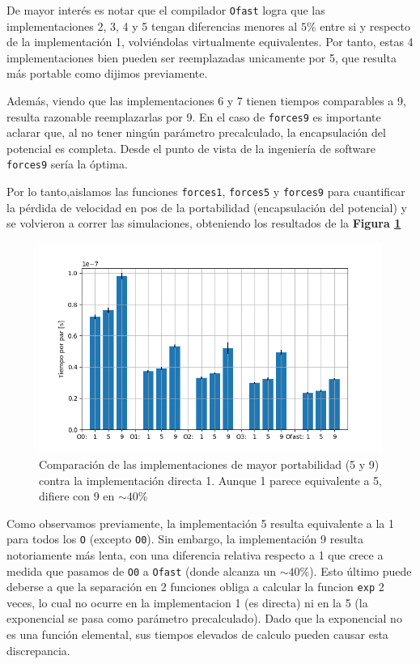 \documentclass[twoside, 12pt]{article}
\begin{document}
De mayor inter\'es es notar que el compilador \texttt{Ofast} logra que las implementaciones 2, 3, 4 y 5 tengan diferencias menores al $5\%$ entre si y respecto de la implementaci\'on 1, volvi\'endolas virtualmente equivalentes.  Por tanto, estas 4 implementaciones bien pueden ser reemplazadas unicamente por 5, que resulta m\'as portable como dijimos previamente.

Adem\'as, viendo que las implementaciones 6 y 7 tienen tiempos comparables a 9, resulta razonable reemplazarlas por 9. En el caso de \texttt{forces9} es importante aclarar que, al no tener ningún parámetro precalculado, la encapsulación del potencial es completa. Desde el punto de vista de la ingeniería de software \texttt{forces9} sería la óptima. 

Por lo tanto,aislamos las funciones \texttt{forces1}, \texttt{forces5} y \texttt{forces9} para cuantificar la pérdida de velocidad en pos de la portabilidad (encapsulación del potencial) y se volvieron a correr las simulaciones, obteniendo los resultados de la \textbf{Figura \ref{fig:CompEsp}}

\begin{figure}[h]
	\centering
	\includegraphics[trim = 10mm 5mm 10mm 5mm, clip, width=0.6\columnwidth]{Comp_tiempos_morse.png}
	\caption{Comparaci\'on de las implementaciones de mayor portabilidad (5 y 9) contra la implementaci\'on directa 1. Aunque 1 parece equivalente a 5, difiere con 9 en $\sim 40\%$}
	\label{fig:CompEsp}
\end{figure}

Como observamos previamente, la implementaci\'on 5 resulta equivalente a la 1 para todos los \texttt{O} (excepto \texttt{O0}). Sin embargo, la implementaci\'on 9 resulta notoriamente m\'as lenta, con una diferencia relativa respecto a 1 que crece a medida que pasamos de \texttt{O0} a \texttt{Ofast} (donde alcanza un $\sim40\%$). Esto \'ultimo puede deberse a que la separaci\'on en 2 funciones obliga a calcular la funcion \texttt{exp} 2  veces, lo cual no ocurre en la implementacion 1 (es directa) ni en la 5 (la exponencial se pasa como par\'ametro precalculado). Dado que la exponencial no es una funci\'on elemental, sus tiempos elevados de calculo pueden causar esta discrepancia.
\end{document}
